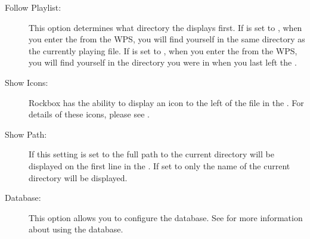\begin{description}
\begin{description}
  \end{description}
  
\item[Follow Playlist:] 
  This option determines what directory the  displays
  first. If  is set to , when you enter
  the  from the WPS, you will find yourself in the same
  directory as the currently playing file. If  is set
  to , when you enter the  from the WPS, you
  will find yourself in the directory you were in when you last left the
  .
  
\item[Show Icons:]
  Rockbox has the ability to display an icon to the left of the file
  in the . For details of these icons, please see
  .

\item[Show Path:]
  If this setting is set to  the full path to the current
  directory will be displayed on the first line in the .
  If set to  only the name of the current
  directory will be displayed.

\item[Database:]
  This option allows you to configure the database.
  See  for more information about using
  the database.
\end{description}
